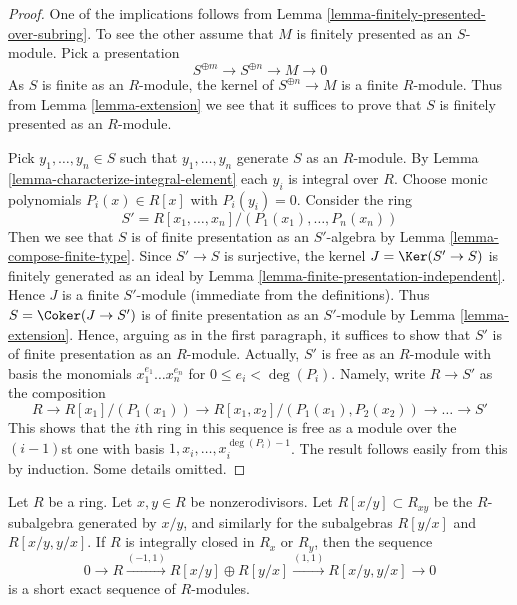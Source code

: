 \begin{proof}
One of the implications follows from
Lemma \ref{lemma-finitely-presented-over-subring}.
To see the other assume that $M$ is finitely presented as an $S$-module.
Pick a presentation
$$
S^{\oplus m} \longrightarrow
S^{\oplus n} \longrightarrow
M \longrightarrow 0
$$
As $S$ is finite as an $R$-module, the kernel of
$S^{\oplus n} \to M$ is a finite $R$-module. Thus from
Lemma \ref{lemma-extension}
we see that it suffices to prove that $S$ is finitely presented as an
$R$-module.

\medskip\noindent
Pick $y_1, \ldots, y_n \in S$ such that $y_1, \ldots, y_n$ generate $S$
as an $R$-module. By Lemma \ref{lemma-characterize-integral-element}
each $y_i$ is integral over $R$. Choose monic polynomials
$P_i(x) \in R[x]$ with $P_i(y_i) = 0$. Consider the ring
$$
S' = R[x_1, \ldots, x_n]/(P_1(x_1), \ldots, P_n(x_n))
$$
Then we see that $S$ is of finite presentation as an $S'$-algebra
by Lemma \ref{lemma-compose-finite-type}. Since $S' \to S$ is surjective,
the kernel $J = \Ker(S' \to S)$ is finitely generated as an ideal by
Lemma \ref{lemma-finite-presentation-independent}. Hence $J$ is a finite
$S'$-module (immediate from the definitions).
Thus $S = \Coker(J \to S')$ is  of finite presentation as an $S'$-module
by Lemma \ref{lemma-extension}.
Hence, arguing as in the first paragraph, it suffices to show that $S'$ is
of finite presentation as an $R$-module. Actually, $S'$ is free as an
$R$-module with basis the monomials $x_1^{e_1} \ldots x_n^{e_n}$
for $0 \leq e_i < \deg(P_i)$. Namely, write $R \to S'$ as the composition
$$
R \to R[x_1]/(P_1(x_1)) \to R[x_1, x_2]/(P_1(x_1), P_2(x_2)) \to
\ldots \to S'
$$
This shows that the $i$th ring in this sequence is free as a module over the
$(i - 1)$st one with basis $1, x_i, \ldots, x_i^{\deg(P_i) - 1}$. The result
follows easily from this by induction. Some details omitted.
\end{proof}

\begin{lemma}
\label{lemma-silly-normal}
Let $R$ be a ring. Let $x, y \in R$ be nonzerodivisors.
Let $R[x/y] \subset R_{xy}$ be the $R$-subalgebra generated
by $x/y$, and similarly for the subalgebras $R[y/x]$ and $R[x/y, y/x]$.
If $R$ is integrally closed in $R_x$ or $R_y$, then the sequence
$$
0 \to R \xrightarrow{(-1, 1)} R[x/y] \oplus R[y/x] \xrightarrow{(1, 1)}
R[x/y, y/x] \to 0
$$
is a short exact sequence of $R$-modules.
\end{lemma}

